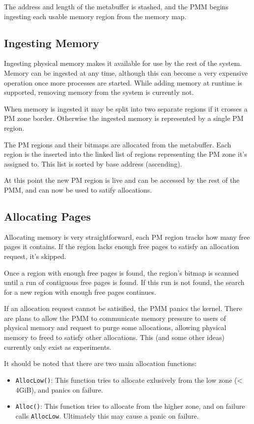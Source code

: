 The address and length of the metabuffer is stashed, and the PMM begins ingesting each usable memory region from the memory map.

\subsection{Ingesting Memory}
Ingesting physical memory makes it available for use by the rest of the system. Memory can be ingested at any time, although this can become a very expensive operation once more processes are started. While adding memory at runtime is supported, removing memory from the system is currently not.

When memory is ingested it may be split into two separate regions if it crosses a PM zone border. Otherwise the ingested memory is represented by a single PM region. 

The PM regions and their bitmaps are allocated from the metabuffer. Each region is the inserted into the linked list of regions representing the PM zone it's assigned to. This list is sorted by base address (ascending).

At this point the new PM region is live and can be accessed by the rest of the PMM, and can now be used to satify allocations.

\subsection{Allocating Pages}
Allocating memory is very straightforward, each PM region tracks how many free pages it contains. If the region lacks enough free pages to satisfy an allocation request, it's skipped.

Once a region with enough free pages is found, the region's bitmap is scanned until a run of contiguous free pages is found. If this run is not found, the search for a new region with enough free pages continues.

If an allocation request cannot be satisified, the PMM panics the kernel. There are plans to allow the PMM to communicate memory pressure to users of physical memory and request to purge some allocations, allowing physical memory to freed to satisfy other allocations. This (and some other ideas) currently only exist as experiments.

It should be noted that there are two main allocation functions:
\begin{itemize}
    \item \verb|AllocLow()|: This function tries to allocate exlusively from the low zone (< 4GiB), and panics on failure.
    \item \verb|Alloc()|: This function tries to allocate from the higher zone, and on failure calls \verb|AllocLow|. Ultimately this may cause a panic on failure.
\end{itemize}

